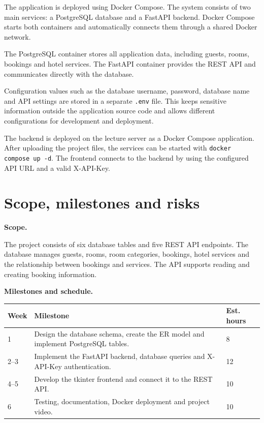 \documentclass[11pt,a4paper]{article}
\begin{document}
The application is deployed using Docker Compose. The system consists of two
main services: a PostgreSQL database and a FastAPI backend. Docker Compose
starts both containers and automatically connects them through a shared Docker
network.

The PostgreSQL container stores all application data, including guests, rooms,
bookings and hotel services. The FastAPI container provides the REST API and
communicates directly with the database.

Configuration values such as the database username, password, database name and
API settings are stored in a separate \texttt{.env} file. This keeps sensitive
information outside the application source code and allows different
configurations for development and deployment.

The backend is deployed on the lecture server as a Docker Compose application.
After uploading the project files, the services can be started with
\texttt{docker compose up -d}. The frontend connects to the backend by using
the configured API URL and a valid X-API-Key.

\section{Scope, milestones and risks}

\textbf{Scope.}

The project consists of six database tables and five REST API endpoints.
The database manages guests, rooms, room categories, bookings, hotel services
and the relationship between bookings and services. The API supports reading and creating booking information.

\textbf{Milestones and schedule.}

\renewcommand{\arraystretch}{1.2}

\begin{tabularx}{\linewidth}{@{}p{1.4cm}Xp{1.8cm}@{}}
\toprule
\textbf{Week} & \textbf{Milestone} & \textbf{Est. hours} \\
\midrule

1 &
Design the database schema, create the ER model and implement PostgreSQL tables.
&
8 \\

2--3 &
Implement the FastAPI backend, database queries and X-API-Key authentication.
&
12 \\

4--5 &
Develop the tkinter frontend and connect it to the REST API.
&
10 \\

6 &
Testing, documentation, Docker deployment and project video.
&
10 \\

\bottomrule
\end{tabularx}
\end{document}
